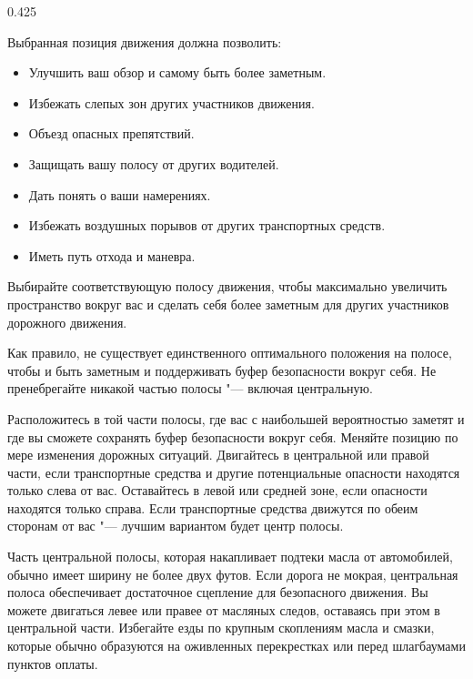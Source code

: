 \begin{langblock}{0.425}
\begin{rus}
		Выбранная позиция движения должна позволить:
		\begin{itemize}[noitemsep]
			\item Улучшить ваш обзор и самому быть более заметным.
			\item Избежать слепых зон других участников движения.
			\item Объезд опасных препятствий.
			\item Защищать вашу полосу от других водителей.
			\item Дать понять о ваши намерениях.
			\item Избежать воздушных порывов от других транспортных средств.
			\item Иметь путь отхода и маневра.
		\end{itemize}
		
		Выбирайте соответствующую полосу движения, чтобы максимально увеличить пространство вокруг вас и сделать себя более заметным для других участников дорожного движения.
		
		Как правило, не существует единственного оптимального положения на полосе, чтобы и быть заметным и поддерживать буфер безопасности вокруг себя. Не пренебрегайте никакой частью полосы  "--- включая центральную.
		
		Расположитесь в той части полосы, где вас с наибольшей вероятностью заметят и где вы сможете сохранять буфер безопасности вокруг себя. Меняйте позицию по мере изменения дорожных ситуаций. Двигайтесь в центральной или правой части, если транспортные средства и другие потенциальные опасности находятся только слева от вас. Оставайтесь в левой или средней зоне, если опасности находятся только справа. Если транспортные средства движутся по обеим сторонам от вас "--- лучшим вариантом будет центр полосы.
		
		Часть центральной полосы, которая накапливает подтеки масла от автомобилей, обычно имеет ширину не более двух футов. Если дорога не мокрая, центральная полоса обеспечивает достаточное сцепление для безопасного движения. Вы можете двигаться левее или правее от масляных следов, оставаясь при этом в центральной части. Избегайте езды по крупным скоплениям масла и смазки, которые обычно образуются на оживленных перекрестках или перед шлагбаумами пунктов оплаты.
\end{rus}
\end{langblock}







